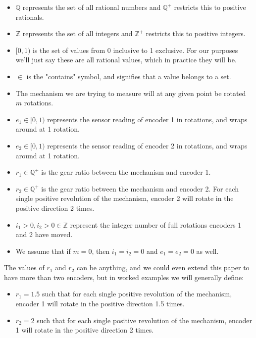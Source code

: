 \documentclass[11pt]{article}
\begin{document}
\begin{itemize}
    \item $\mathbb{Q}$ represents the set of all rational numbers and $\mathbb{Q^+}$ restricts this to positive rationals.
    \item $\mathbb{Z}$ represents the set of all integers and $\mathbb{Z^+}$ restricts this to positive integers.
    \item $[0, 1)$ is the set of values from 0 inclusive to 1 exclusive. For our purposes we'll just say these are all rational values, which in practice they will be.
    \item $\in$ is the "contains" symbol, and signifies that a value belongs to a set.
    \item The mechanism we are trying to measure will at any given point be rotated $m$ rotations.
    \item $e_1 \in [0, 1)$ represents the sensor reading of encoder 1 in rotations, and wraps around at 1 rotation. 
    \item $e_2 \in [0, 1)$ represents the sensor reading of encoder 2 in rotations, and wraps around at 1 rotation.
    \item $r_1 \in \mathbb{Q^+}$ is the gear ratio between the mechanism and encoder 1.
    \item $r_2 \in \mathbb{Q^+}$ is the gear ratio between the mechanism and encoder 2. For each single positive revolution of the mechanism, encoder 2 will rotate in the positive direction 2 times.
    \item $i_1 > 0, i_2 > 0 \in \mathbb{Z}$ represent the integer number of full rotations encoders 1 and 2 have moved.
    \item We assume that if $m = 0$, then $i_1 = i_2 = 0$ and $e_1 = e_2 = 0$ as well. 
\end{itemize}

The values of $r_1$ and $r_2$ can be anything, and we could even extend this paper to have more than two encoders, but in worked examples we will generally define:

\begin{itemize}
    \item $r_1 = 1.5$ such that for each single positive revolution of the mechanism, encoder 1 will rotate in the positive direction 1.5 times.
    \item $r_2 = 2$ such that for each single positive revolution of the mechanism, encoder 1 will rotate in the positive direction 2 times.
\end{itemize}
\end{document}
